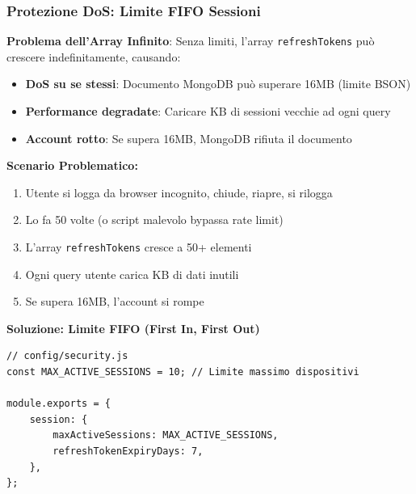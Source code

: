 \documentclass[11pt,a4paper]{article}
\newcommand{\code}[1]{\texttt{#1}}
\newcommand{\important}[1]{\textcolor{red!80!black}{\textbf{#1}}}
\begin{document}
\subsubsection{Protezione DoS: Limite FIFO Sessioni}

\important{Problema dell'Array Infinito}: Senza limiti, l'array \code{refreshTokens} può crescere indefinitamente, causando:
\begin{itemize}
    \item \textbf{DoS su se stessi}: Documento MongoDB può superare 16MB (limite BSON)
    \item \textbf{Performance degradate}: Caricare KB di sessioni vecchie ad ogni query
    \item \textbf{Account rotto}: Se supera 16MB, MongoDB rifiuta il documento
\end{itemize}

\textbf{Scenario Problematico:}
\begin{enumerate}
    \item Utente si logga da browser incognito, chiude, riapre, si rilogga
    \item Lo fa 50 volte (o script malevolo bypassa rate limit)
    \item L'array \code{refreshTokens} cresce a 50+ elementi
    \item Ogni query utente carica KB di dati inutili
    \item Se supera 16MB, l'account si rompe
\end{enumerate}

\textbf{Soluzione: Limite FIFO (First In, First Out)}

\begin{lstlisting}[caption=Configurazione Limite Sessioni]
// config/security.js
const MAX_ACTIVE_SESSIONS = 10; // Limite massimo dispositivi

module.exports = {
    session: {
        maxActiveSessions: MAX_ACTIVE_SESSIONS,
        refreshTokenExpiryDays: 7,
    },
};
\end{lstlisting}
\end{document}
